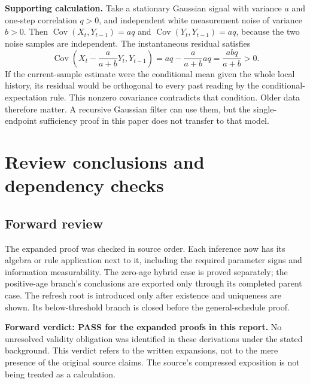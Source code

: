 \documentclass[12pt,letterpaper]{article}
\newcommand{\Cov}{\operatorname{Cov}}
\begin{document}
\textbf{Supporting calculation.} Take a stationary Gaussian signal with variance $a$ and one-step correlation $q>0$, and independent white measurement noise of variance $b>0$. Then $\Cov(X_t,Y_{t-1})=aq$ and $\Cov(Y_t,Y_{t-1})=aq$, because the two noise samples are independent. The instantaneous residual satisfies
\[
\Cov\left(X_t-\frac{a}{a+b}Y_t,Y_{t-1}\right)
=aq-\frac{a}{a+b}aq=\frac{abq}{a+b}>0.
\]
If the current-sample estimate were the conditional mean given the whole local history, its residual would be orthogonal to every past reading by the conditional-expectation rule. This nonzero covariance contradicts that condition. Older data therefore matter. A recursive Gaussian filter can use them, but the single-endpoint sufficiency proof in this paper does not transfer to that model.


\clearpage
\section{Review conclusions and dependency checks}
\subsection{Forward review}
The expanded proof was checked in source order. Each inference now has its algebra or rule application next to it, including the required parameter signs and information measurability. The zero-age hybrid case is proved separately; the positive-age branch's conclusions are exported only through its completed parent case. The refresh root is introduced only after existence and uniqueness are shown. Its below-threshold branch is closed before the general-schedule proof.

\textbf{Forward verdict: PASS for the expanded proofs in this report.} No unresolved validity obligation was identified in these derivations under the stated background. This verdict refers to the written expansions, not to the mere presence of the original source claims. The source's compressed exposition is not being treated as a calculation.
\end{document}
